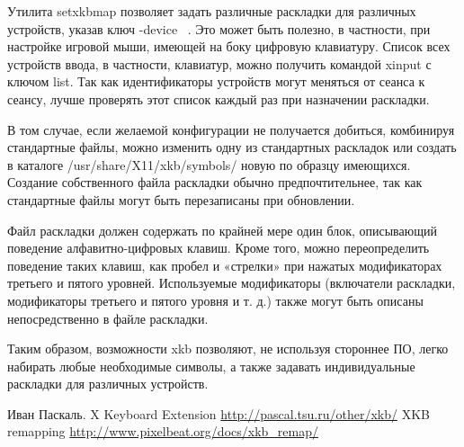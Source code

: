 \documentclass[10pt, a5paper]{article}
\begin{document}
Утилита setxkbmap позволяет задать различные раскладки для различных устройств, указав ключ -device ~\cite{Kononova2}. Это может быть полезно, в частности, при настройке игровой мыши, имеющей на боку цифровую клавиатуру. Список всех устройств ввода, в частности, клавиатур, можно получить командой  xinput с ключом list. Так как идентификаторы устройств могут меняться от сеанса к сеансу, лучше проверять этот список каждый раз при назначении раскладки.

В том случае, если желаемой конфигурации не получается добиться, комбинируя стандартные файлы, можно изменить одну из стандартных раскладок или создать в каталоге \linebreak /usr/share/X11/xkb/symbols/ новую по образцу имеющихся. Создание собственного файла раскладки обычно предпочтительнее, так как стандартные файлы могут быть перезаписаны при обновлении.

Файл раскладки должен содержать по крайней мере один блок, описывающий поведение алфавитно-цифровых клавиш. Кроме того, можно переопределить поведение таких клавиш, как пробел и «стрелки» при нажатых модификаторах третьего и пятого уровней.
Используемые модификаторы (включатели раскладки, модификаторы третьего и пятого уровня и т. д.) также могут быть описаны непосредственно в файле раскладки.

Таким образом, возможности xkb позволяют, не используя стороннее ПО, легко набирать любые необходимые символы, а также задавать индивидуальные раскладки для различных устройств.

\begin{thebibliography}{99}
 Иван Паскаль. X Keyboard Extension \url{http://pascal.tsu.ru/other/xkb/}
 XKB remapping \url{http://www.pixelbeat.org/docs/xkb\_remap/}
\end{thebibliography}
\end{document}
